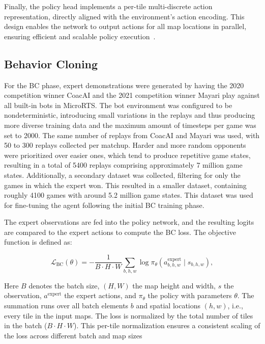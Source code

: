 \documentclass[10pt,twocolumn,letterpaper]{article}
\begin{document}
Finally, the policy head implements a per-tile multi-discrete action representation, directly aligned with the environment’s action encoding. This design enables the network to output actions for all map locations in parallel, ensuring efficient and scalable policy execution~\cite{huang2020observation}.




\subsection{Behavior Cloning}
\label{sec:bc}
For the BC phase, expert demonstrations were generated by having the 2020 competition winner CoacAI and the 2021 competition winner Mayari play against all built-in bots in MicroRTS. The bot environment was configured to be nondeterministic, introducing small variations in the replays and thus producing more diverse training data and the maximum amount of timesteps per game was set to 2000. The same number of replays from CoacAI and Mayari was used, with 50 to 300 replays collected per matchup. Harder and more random opponents were prioritized over easier ones, which tend to produce repetitive game states, resulting in a total of 5400 replays comprising approximately 7 million game states.
Additionally, a secondary dataset was collected, filtering for only the games in which the expert won. This resulted in a smaller dataset, containing roughly 4100 games with around 5.2 million game states. This dataset was used for fine-tuning the agent following the initial BC training phase.

The expert observations are fed into the policy network, and the resulting logits are compared to the expert actions to compute the BC loss. The objective function is defined as:

\[
\mathcal{L}_{\text{BC}}(\theta) = - \frac{1}{B \cdot H \cdot W} \sum_{b,h,w} \log \pi_\theta(a^{\text{expert}}_{b,h,w} \mid s_{b,h,w}),
\]

Here $B$ denotes the batch size, $(H,W)$ the map height and width, $s$ the observation, $a^{\text{expert}}$ the expert actions, and $\pi_{\theta}$ the policy with parameters $\theta$. The summation runs over all batch elements $b$ and spatial locations $(h,w)$, i.e., every tile in the input maps. The loss is normalized by the total number of tiles in the batch ($B \cdot H \cdot W$). This per-tile normalization ensures a consistent scaling of the loss across different batch and map sizes
\end{document}
